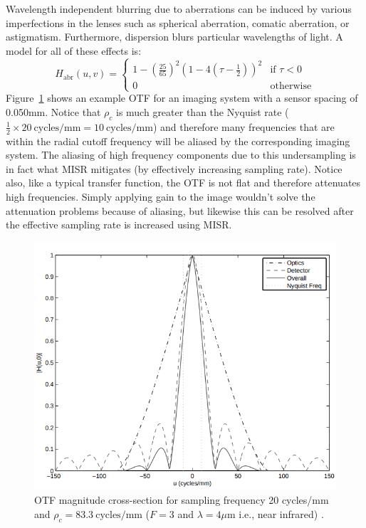 Wavelength independent blurring due to aberrations can be induced by various imperfections in the lenses such as spherical aberration, comatic aberration, or astigmatism. Furthermore, dispersion blurs particular wavelengths of light. A model for all of these effects \cite{10.1117.12.946501} is:
\begin{equation*}
	H_{\text{abr}}(u,v) =   \begin{cases}
		1-\left(\frac{25}{65}\right)^2 \left(1-4\left(\tau - \frac{1}{2}\right)\right)^2 & \text{if } \tau < 0 \\
		0                                                                                & \text{otherwise}
	\end{cases}
\end{equation*}
Figure~\ref{fig:mtf} shows an example OTF for an imaging system with a sensor spacing of 0.050mm.
%
Notice that \(\rho_c\) is much greater than the Nyquist rate (\(\frac{1}{2} \times 20~\text{cycles}/\text{mm} = 10~\text{cycles}/\text{mm}\)) and therefore many frequencies that are within the radial cutoff frequency will be aliased by the corresponding imaging system.
%
The aliasing of high frequency components due to this undersampling is in fact what MISR mitigates (by effectively increasing sampling rate).
%
Notice also, like a typical transfer function, the OTF is not flat and therefore attenuates high frequencies.
%
Simply applying gain to the image wouldn't solve the attenuation problems because of aliasing, but likewise this can be resolved after the effective sampling rate is increased using MISR.
\begin{figure}[!htbp]
	\includegraphics[width=\linewidth,keepaspectratio]{figures/background/mtf.png}
	\caption{OTF magnitude cross-section for sampling frequency 20 cycles/mm and \(\rho_c = 83.3~\text{cycles}/\text{mm}\) (\(F=3\) and \(\lambda = 4\mu\text{m}\) i.e., near infrared)      \cite{milanfar2017super}.}
	\label{fig:mtf}
\end{figure}

